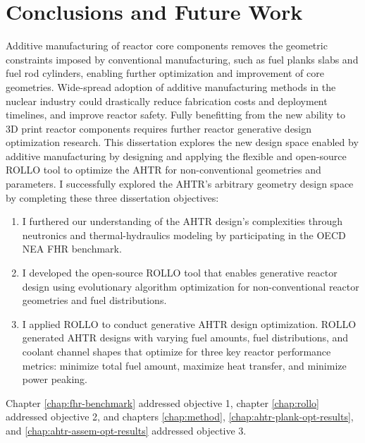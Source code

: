 \chapter{Conclusions and Future Work}
\glsresetall
\label{chap:concl}

Additive manufacturing of reactor core components removes the geometric constraints
imposed by conventional manufacturing, such as fuel planks slabs and fuel rod 
cylinders, enabling further optimization and improvement of core geometries. 
Wide-spread adoption of additive manufacturing methods in the nuclear industry
could drastically reduce fabrication costs and deployment timelines, and improve 
reactor safety. 
Fully benefitting from the new ability to 3D print reactor components requires further 
reactor generative design optimization research. 
This dissertation explores the new design space enabled by additive manufacturing 
by designing and applying the flexible and open-source \gls{ROLLO} tool to optimize 
the \gls{AHTR} for non-conventional geometries and parameters. 
I successfully explored the \gls{AHTR}'s arbitrary geometry design space by completing 
these three dissertation objectives: 
\begin{enumerate}
    \item I furthered our understanding of the \gls{AHTR} design's complexities 
    through neutronics and thermal-hydraulics modeling by participating in the 
    \gls{OECD} \gls{NEA} \gls{FHR} benchmark.
    \item I developed the open-source \gls{ROLLO} tool that enables generative reactor 
    design using evolutionary algorithm optimization for non-conventional reactor 
    geometries and fuel distributions.
    \item I applied \gls{ROLLO} to conduct generative \gls{AHTR} design optimization.
    \gls{ROLLO} generated \gls{AHTR} designs with varying fuel amounts, fuel 
    distributions, and coolant channel shapes that optimize for three key reactor 
    performance metrics: minimize total fuel amount, maximize heat transfer, and 
    minimize power peaking.
\end{enumerate}
Chapter \ref{chap:fhr-benchmark} addressed objective 1, chapter \ref{chap:rollo} 
addressed objective 2, and chapters \ref{chap:method}, \ref{chap:ahtr-plank-opt-results}, 
and \ref{chap:ahtr-assem-opt-results} addressed objective 3. 

